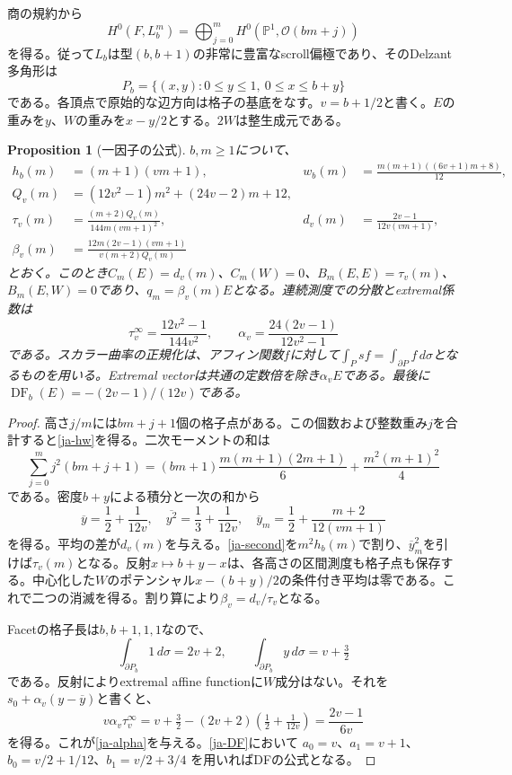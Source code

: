 \documentclass[12pt]{amsart}
\newtheorem{prop}[thm]{Proposition}
\theoremstyle{definition}
\theoremstyle{remark}
\numberwithin{equation}{section}
\newcommand{\cO}{\mathcal{O}}
\newcommand{\mP}{\mathbb{P}}
\DeclareMathOperator{\DF}{DF}
\begin{document}
商の規約から
\[
H^0(F,L_b^m)=\bigoplus_{j=0}^mH^0(\mP^1,\cO(bm+j))
\]
を得る。従って$L_b$は型$(b,b+1)$の非常に豊富なscroll偏極であり、そのDelzant多角形は
\begin{equation}\label{ja-poly}
P_b=\{(x,y):0\leq y\leq1,\ 0\leq x\leq b+y\}
\end{equation}
である。各頂点で原始的な辺方向は格子の基底をなす。$v=b+1/2$と書く。$E$の重みを$y$、$W$の重みを$x-y/2$とする。$2W$は整生成元である。

\begin{prop}[一因子の公式]\label{ja-mom}
$b,m\geq1$について、
\begin{align}\label{ja-hw}
h_b(m)&=(m+1)(vm+1),&
w_b(m)&=\frac{m(m+1)((6v+1)m+8)}{12},\\
Q_v(m)&=(12v^2-1)m^2+(24v-2)m+12,\label{ja-Q}\\
\tau_v(m)&=\frac{(m+2)Q_v(m)}{144m(vm+1)^2},&
d_v(m)&=\frac{2v-1}{12v(vm+1)},\label{ja-td}\\
\beta_v(m)&=\frac{12m(2v-1)(vm+1)}{v(m+2)Q_v(m)}\label{ja-beta}
\end{align}
とおく。このとき$C_m(E)=d_v(m)$、$C_m(W)=0$、$B_m(E,E)=\tau_v(m)$、$B_m(E,W)=0$であり、$q_m=\beta_v(m)E$となる。連続測度での分散とextremal係数は
\begin{equation}\label{ja-alpha}
\tau_v^\infty=\frac{12v^2-1}{144v^2},\qquad
\alpha_v=\frac{24(2v-1)}{12v^2-1}
\end{equation}
である。スカラー曲率の正規化は、アフィン関数$f$に対して$\int_Psf=\int_{\partial P}f\,d\sigma$となるものを用いる。Extremal vectorは共通の定数倍を除き$\alpha_vE$である。最後に$\DF_b(E)=-(2v-1)/(12v)$である。
\end{prop}
\begin{proof}
高さ$j/m$には$bm+j+1$個の格子点がある。この個数および整数重み$j$を合計すると\eqref{ja-hw}を得る。二次モーメントの和は
\begin{equation}\label{ja-second}
\sum_{j=0}^mj^2(bm+j+1)
=(bm+1)\frac{m(m+1)(2m+1)}6+\frac{m^2(m+1)^2}4
\end{equation}
である。密度$b+y$による積分と一次の和から
\[
\overline y=\frac12+\frac1{12v},\quad
\overline{y^2}=\frac13+\frac1{12v},\quad
\overline y_m=\frac12+\frac{m+2}{12(vm+1)}
\]
を得る。平均の差が$d_v(m)$を与える。\eqref{ja-second}を$m^2h_b(m)$で割り、$\overline y_m^2$を引けば$\tau_v(m)$となる。反射$x\mapsto b+y-x$は、各高さの区間測度も格子点も保存する。中心化した$W$のポテンシャル$x-(b+y)/2$の条件付き平均は零である。これで二つの消滅を得る。割り算により$\beta_v=d_v/\tau_v$となる。

Facetの格子長は$b,b+1,1,1$なので、
\[
\int_{\partial P_b}1\,d\sigma=2v+2,\qquad
\int_{\partial P_b}y\,d\sigma=v+\tfrac32
\]
である。反射によりextremal affine functionに$W$成分はない。それを$s_0+\alpha_v(y-\overline y)$と書くと、
\[
v\alpha_v\tau_v^\infty
=v+\tfrac32-(2v+2)\left(\tfrac12+\tfrac1{12v}\right)
=\frac{2v-1}{6v}
\]
を得る。これが\eqref{ja-alpha}を与える。\eqref{ja-DF}において
$a_0=v$、$a_1=v+1$、$b_0=v/2+1/12$、$b_1=v/2+3/4$
を用いればDFの公式となる。
\end{proof}
\end{document}
